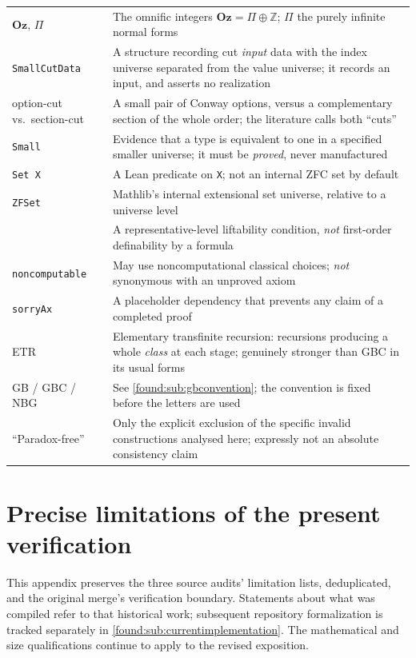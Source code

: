 \documentclass[11pt,letterpaper]{article}
\numberwithin{equation}{section}
\theoremstyle{definition}
\theoremstyle{remark}
\newcommand{\Oz}{\mathbf{Oz}}
\newcommand{\Z}{\mathbb Z}
\begin{document}
\begin{longtable}{@{}P{0.25\textwidth}P{0.67\textwidth}@{}}
$\Oz$, $\Pi$ & The omnific integers $\Oz=\Pi\oplus\Z$; $\Pi$ the purely infinite normal forms\\[0.3em]
\texttt{SmallCutData} & A structure recording cut \emph{input} data with the index universe separated from the value universe; it records an input, and asserts no realization\\[0.3em]
option-cut vs.\ section-cut & A small pair of Conway options, versus a complementary section of the whole order; the literature calls both ``cuts''\\[0.3em]
\texttt{Small} & Evidence that a type is equivalent to one in a specified smaller universe; it must be \emph{proved}, never manufactured\\[0.3em]
\texttt{Set X} & A Lean predicate on \texttt{X}; not an internal ZFC set by default\\[0.3em]
\texttt{ZFSet} & Mathlib's internal extensional set universe, relative to a universe level\\[0.3em]
 & A representative-level liftability condition, \emph{not} first-order definability by a formula\\[0.3em]
\texttt{noncomputable} & May use noncomputational classical choices; \emph{not} synonymous with an unproved axiom\\[0.3em]
\texttt{sorryAx} & A placeholder dependency that prevents any claim of a completed proof\\[0.3em]
ETR & Elementary transfinite recursion: recursions producing a whole \emph{class} at each stage; genuinely stronger than GBC in its usual forms\\[0.3em]
GB / GBC / NBG & See \cref{found:sub:gbconvention}; the convention is fixed before the letters are used\\[0.3em]
``Paradox-free'' & Only the explicit exclusion of the specific invalid constructions analysed here; expressly not an absolute consistency claim\\
\bottomrule
\end{longtable}

\section{Precise limitations of the present verification}
\label{found:app:limitations}

This appendix preserves the three source audits' limitation lists, deduplicated,
and the original merge's verification boundary. Statements about what was
compiled refer to that historical work; subsequent repository formalization is
tracked separately in \cref{found:sub:currentimplementation}. The mathematical
and size qualifications continue to apply to the revised exposition.
\end{document}

